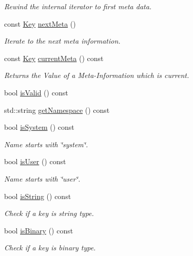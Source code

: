 \begin{DoxyCompactItemize}
\begin{DoxyCompactList}\small\item\em Rewind the internal iterator to first meta data. \end{DoxyCompactList}\item 
const \hyperlink{classkdb_1_1Key}{Key} \hyperlink{classkdb_1_1Key_a855f37fef58a4ea4006d9e281f66cfe1}{next\+Meta} ()
\begin{DoxyCompactList}\small\item\em Iterate to the next meta information. \end{DoxyCompactList}\item 
const \hyperlink{classkdb_1_1Key}{Key} \hyperlink{classkdb_1_1Key_a2be586ccd64cd280561ba5cd23f6ff1e}{current\+Meta} () const 
\begin{DoxyCompactList}\small\item\em Returns the Value of a Meta-\/\+Information which is current. \end{DoxyCompactList}\item 
bool \hyperlink{classkdb_1_1Key_acbb13cfcabb4548177e86eec1ac16d87}{is\+Valid} () const 
\item 
std\+::string \hyperlink{classkdb_1_1Key_a2cf2b97f404d5808f46a9a5c4b8b93e1}{get\+Namespace} () const 
\item 
bool \hyperlink{classkdb_1_1Key_ac0f21b82a3d851eb3dfae53ddcfdbe48}{is\+System} () const 
\begin{DoxyCompactList}\small\item\em Name starts with \char`\"{}system\char`\"{}. \end{DoxyCompactList}\item 
bool \hyperlink{classkdb_1_1Key_ab6103772c702b400eaefbc4665f5c0cf}{is\+User} () const 
\begin{DoxyCompactList}\small\item\em Name starts with \char`\"{}user\char`\"{}. \end{DoxyCompactList}\item 
bool \hyperlink{classkdb_1_1Key_aa60e37609593de715c342740c76040cc}{is\+String} () const 
\begin{DoxyCompactList}\small\item\em Check if a key is string type. \end{DoxyCompactList}\item 
bool \hyperlink{classkdb_1_1Key_aad92210fe2389ad950a47a4eca428574}{is\+Binary} () const 
\begin{DoxyCompactList}\small\item\em Check if a key is binary type. \end{DoxyCompactList}\item 

\end{DoxyCompactItemize}
